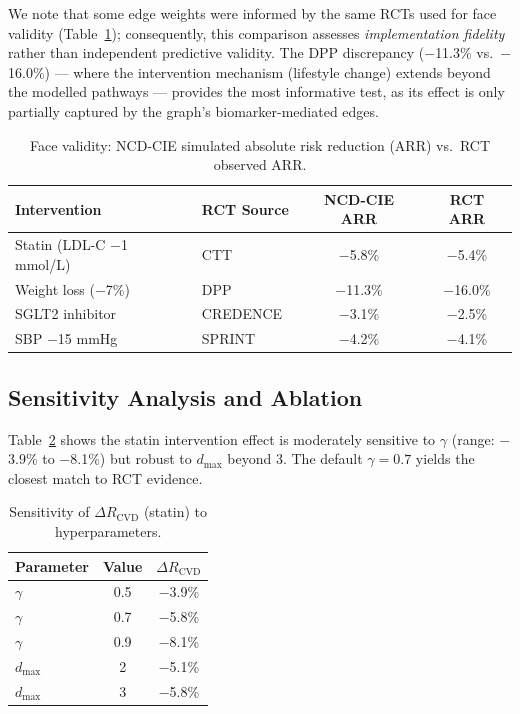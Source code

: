 \documentclass[runningheads]{llncs}
\begin{document}
We note that some edge weights were informed by the same RCTs used for
face validity (Table~\ref{tab:rct}); consequently, this comparison
assesses \emph{implementation fidelity} rather than independent
predictive validity.  The DPP discrepancy ($-$11.3\% vs.\ $-$16.0\%)
--- where the intervention mechanism (lifestyle change) extends beyond
the modelled pathways --- provides the most informative test, as its
effect is only partially captured by the graph's biomarker-mediated
edges.

\begin{table}[t]
\centering
\caption{Face validity: NCD-CIE simulated absolute risk reduction
(ARR) vs.\ RCT observed ARR.}
\label{tab:rct}
\small
\begin{tabular}{@{}llcc@{}}
\toprule
\textbf{Intervention} & \textbf{RCT Source} &
\textbf{NCD-CIE ARR} & \textbf{RCT ARR} \\
\midrule
Statin (LDL-C $-$1 mmol/L) & CTT~\cite{ctt2010}
  & $-$5.8\% & $-$5.4\% \\
Weight loss ($-$7\%) & DPP~\cite{knowler2002dpp}
  & $-$11.3\% & $-$16.0\% \\
SGLT2 inhibitor & CREDENCE~\cite{perkovic2019credence}
  & $-$3.1\% & $-$2.5\% \\
SBP $-$15 mmHg & SPRINT~\cite{sprint2015}
  & $-$4.2\% & $-$4.1\% \\
\bottomrule
\end{tabular}
\end{table}

\subsection{Sensitivity Analysis and Ablation}\label{sec:sensitivity}

Table~\ref{tab:sensitivity} shows the statin intervention effect is
moderately sensitive to $\gamma$ (range: $-$3.9\% to $-$8.1\%) but
robust to $d_{\max}$ beyond 3.  The default $\gamma = 0.7$ yields
the closest match to RCT evidence.

\begin{table}[t]
\centering
\caption{Sensitivity of $\Delta R_{\text{CVD}}$ (statin) to
hyperparameters.}\label{tab:sensitivity}
\small
\begin{tabular}{@{}lcc@{}}
\toprule
\textbf{Parameter} & \textbf{Value} & \textbf{$\Delta R_{\text{CVD}}$} \\
\midrule
$\gamma$ & 0.5 & $-$3.9\% \\
$\gamma$ & 0.7 & $-$5.8\% \\
$\gamma$ & 0.9 & $-$8.1\% \\
$d_{\max}$ & 2 & $-$5.1\% \\
$d_{\max}$ & 3 & $-$5.8\% \\
\bottomrule
\end{tabular}
\end{table}
\end{document}
